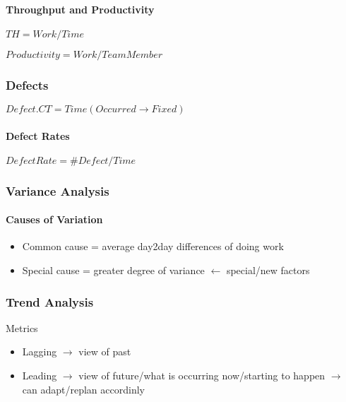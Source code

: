 \documentclass[letterpaper,10pt,english]{jupyterBook}
\begin{document}
\paragraph{Throughput and Productivity}
\label{\detokenize{APM/agile:throughput-and-productivity}}
\sphinxAtStartPar
\(TH=Work/Time\)

\sphinxAtStartPar
\(Productivity=Work/TeamMember\)


\subsubsection{Defects}
\label{\detokenize{APM/agile:defects}}
\sphinxAtStartPar
\(Defect.CT=Time(Occurred \rightarrow Fixed)\)


\paragraph{Defect Rates}
\label{\detokenize{APM/agile:defect-rates}}
\sphinxAtStartPar
\(DefectRate=\#Defect/Time\)


\subsubsection{Variance Analysis}
\label{\detokenize{APM/agile:variance-analysis}}

\paragraph{Causes of Variation}
\label{\detokenize{APM/agile:causes-of-variation}}\begin{itemize}
\item {} 
\sphinxAtStartPar
Common cause = average day\sphinxhyphen{}2\sphinxhyphen{}day differences of doing work

\item {} 
\sphinxAtStartPar
Special cause = greater degree of variance \(\leftarrow\) special/new factors

\end{itemize}


\subsubsection{Trend Analysis}
\label{\detokenize{APM/agile:trend-analysis}}
\sphinxAtStartPar
Metrics
\begin{itemize}
\item {} 
\sphinxAtStartPar
Lagging \(\rightarrow\) view of past

\item {} 
\sphinxAtStartPar
Leading \(\rightarrow\) view of future/what is occurring now/starting to happen \(\rightarrow\) can adapt/replan accordinly

\end{itemize}
\end{document}
